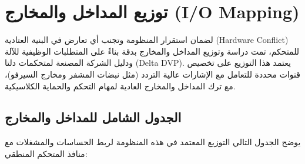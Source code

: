 \section{توزيع المداخل والمخارج \textenglish{(I/O Mapping)}}
لضمان استقرار المنظومة وتجنب أي تعارض في البنية العتادية \textenglish{(Hardware Conflict)} للمتحكم، تمت دراسة وتوزيع المداخل والمخارج بدقة بناءً على المتطلبات الوظيفية للآلة ودليل الشركة المصنعة لمتحكمات دلتا \textenglish{(Delta DVP)}. يعتمد هذا التوزيع على تخصيص قنوات محددة للتعامل مع الإشارات عالية التردد (مثل نبضات المشفر ومخارج السيرفو)، مع ترك المداخل والمخارج العادية لمهام التحكم والحماية الكلاسيكية.

\subsection{الجدول الشامل للمداخل والمخارج}
يوضح الجدول التالي التوزيع المعتمد في هذه المنظومة لربط الحساسات والمشغلات مع منافذ المتحكم المنطقي:

